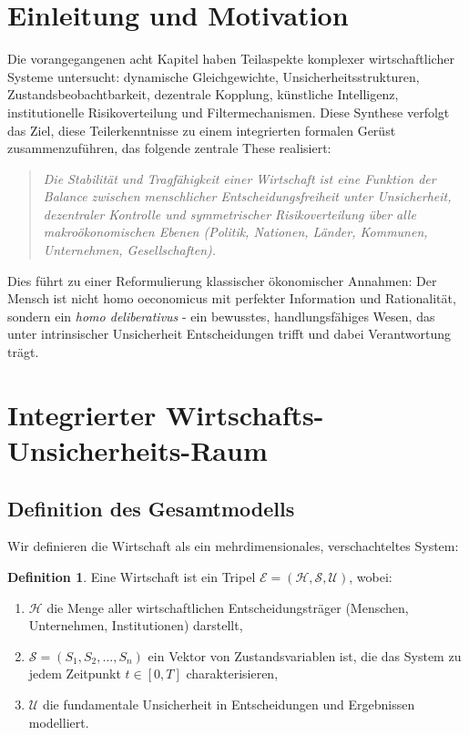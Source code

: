 \documentclass[a4paper, 12pt, twoside, openright]{report}
\theoremstyle{definition}
\newtheorem{definition}[theorem]{Definition}
\theoremstyle{definition}
\begin{document}
\section{Einleitung und Motivation}

Die vorangegangenen acht Kapitel haben Teilaspekte komplexer wirtschaftlicher Systeme untersucht: dynamische Gleichgewichte, Unsicherheitsstrukturen, Zustandsbeobachtbarkeit, dezentrale Kopplung, künstliche Intelligenz, institutionelle Risikoverteilung und Filtermechanismen. Diese Synthese verfolgt das Ziel, diese Teilerkenntnisse zu einem integrierten formalen Gerüst zusammenzuführen, das folgende zentrale These realisiert:

\begin{quote}
\textit{Die Stabilität und Tragfähigkeit einer Wirtschaft ist eine Funktion der Balance zwischen menschlicher Entscheidungsfreiheit unter Unsicherheit, dezentraler Kontrolle und symmetrischer Risikoverteilung über alle makroökonomischen Ebenen (Politik, Nationen, Länder, Kommunen, Unternehmen, Gesellschaften).}
\end{quote}

Dies führt zu einer Reformulierung klassischer ökonomischer Annahmen: Der Mensch ist nicht homo oeconomicus mit perfekter Information und Rationalität, sondern ein \emph{homo deliberativus} - ein bewusstes, handlungsfähiges Wesen, das unter intrinsischer Unsicherheit Entscheidungen trifft und dabei Verantwortung trägt.

\section{Integrierter Wirtschafts-Unsicherheits-Raum}

\subsection{Definition des Gesamtmodells}

Wir definieren die Wirtschaft als ein mehrdimensionales, verschachteltes System:

\begin{definition}
\label{def:wirtschaft-system}
Eine Wirtschaft ist ein Tripel $\mathcal{E} = (\mathcal{H}, \mathcal{S}, \mathcal{U})$, wobei:
\begin{enumerate}
\item $\mathcal{H}$ die Menge aller wirtschaftlichen Entscheidungsträger (Menschen, Unternehmen, Institutionen) darstellt,
\item $\mathcal{S} = (S_1, S_2, \ldots, S_n)$ ein Vektor von Zustandsvariablen ist, die das System zu jedem Zeitpunkt $t \in [0,T]$ charakterisieren,
\item $\mathcal{U}$ die fundamentale Unsicherheit in Entscheidungen und Ergebnissen modelliert.
\end{enumerate}
\end{definition}
\end{document}
